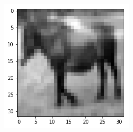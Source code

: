 \begin{figure}[H]
\begin{subfigure}{.3\linewidth}
\end{subfigure}
 \hfill
\begin{subfigure}{.3\linewidth}
 \centering
 \includegraphics[scale=0.4]{chapter_3_figures/interp4.png}
\end{subfigure}


\end{figure}
